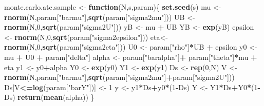\documentclass[]{book}
\newenvironment{Shaded}{\begin{snugshade}}{\end{snugshade}}
\newcommand{\ControlFlowTok}[1]{\textcolor[rgb]{0.13,0.29,0.53}{\textbf{#1}}}
\newcommand{\DecValTok}[1]{\textcolor[rgb]{0.00,0.00,0.81}{#1}}
\newcommand{\KeywordTok}[1]{\textcolor[rgb]{0.13,0.29,0.53}{\textbf{#1}}}
\newcommand{\NormalTok}[1]{#1}
\newcommand{\OperatorTok}[1]{\textcolor[rgb]{0.81,0.36,0.00}{\textbf{#1}}}
\newcommand{\StringTok}[1]{\textcolor[rgb]{0.31,0.60,0.02}{#1}}
\theoremstyle{definition}
\theoremstyle{definition}
\theoremstyle{definition}
\theoremstyle{remark}
\begin{document}
\begin{Shaded}
\begin{Highlighting}[]
\NormalTok{monte.carlo.ate.sample <-}\StringTok{ }\ControlFlowTok{function}\NormalTok{(N,s,param)\{}
  \KeywordTok{set.seed}\NormalTok{(s)}
\NormalTok{  mu <-}\StringTok{ }\KeywordTok{rnorm}\NormalTok{(N,param[}\StringTok{"barmu"}\NormalTok{],}\KeywordTok{sqrt}\NormalTok{(param[}\StringTok{"sigma2mu"}\NormalTok{]))}
\NormalTok{  UB <-}\StringTok{ }\KeywordTok{rnorm}\NormalTok{(N,}\DecValTok{0}\NormalTok{,}\KeywordTok{sqrt}\NormalTok{(param[}\StringTok{"sigma2U"}\NormalTok{]))}
\NormalTok{  yB <-}\StringTok{ }\NormalTok{mu }\OperatorTok{+}\StringTok{ }\NormalTok{UB }
\NormalTok{  YB <-}\StringTok{ }\KeywordTok{exp}\NormalTok{(yB)}
\NormalTok{  epsilon <-}\StringTok{ }\KeywordTok{rnorm}\NormalTok{(N,}\DecValTok{0}\NormalTok{,}\KeywordTok{sqrt}\NormalTok{(param[}\StringTok{"sigma2epsilon"}\NormalTok{]))}
\NormalTok{  eta<-}\StringTok{ }\KeywordTok{rnorm}\NormalTok{(N,}\DecValTok{0}\NormalTok{,}\KeywordTok{sqrt}\NormalTok{(param[}\StringTok{"sigma2eta"}\NormalTok{]))}
\NormalTok{  U0 <-}\StringTok{ }\NormalTok{param[}\StringTok{"rho"}\NormalTok{]}\OperatorTok{*}\NormalTok{UB }\OperatorTok{+}\StringTok{ }\NormalTok{epsilon}
\NormalTok{  y0 <-}\StringTok{ }\NormalTok{mu }\OperatorTok{+}\StringTok{  }\NormalTok{U0 }\OperatorTok{+}\StringTok{ }\NormalTok{param[}\StringTok{"delta"}\NormalTok{]}
\NormalTok{  alpha <-}\StringTok{ }\NormalTok{param[}\StringTok{"baralpha"}\NormalTok{]}\OperatorTok{+}\StringTok{  }\NormalTok{param[}\StringTok{"theta"}\NormalTok{]}\OperatorTok{*}\NormalTok{mu }\OperatorTok{+}\StringTok{ }\NormalTok{eta}
\NormalTok{  y1 <-}\StringTok{ }\NormalTok{y0}\OperatorTok{+}\NormalTok{alpha}
\NormalTok{  Y0 <-}\StringTok{ }\KeywordTok{exp}\NormalTok{(y0)}
\NormalTok{  Y1 <-}\StringTok{ }\KeywordTok{exp}\NormalTok{(y1)}
\NormalTok{  Ds <-}\StringTok{ }\KeywordTok{rep}\NormalTok{(}\DecValTok{0}\NormalTok{,N)}
\NormalTok{  V <-}\StringTok{ }\KeywordTok{rnorm}\NormalTok{(N,param[}\StringTok{"barmu"}\NormalTok{],}\KeywordTok{sqrt}\NormalTok{(param[}\StringTok{"sigma2mu"}\NormalTok{]}\OperatorTok{+}\NormalTok{param[}\StringTok{"sigma2U"}\NormalTok{]))}
\NormalTok{  Ds[V}\OperatorTok{<=}\KeywordTok{log}\NormalTok{(param[}\StringTok{"barY"}\NormalTok{])] <-}\StringTok{ }\DecValTok{1} 
\NormalTok{  y <-}\StringTok{ }\NormalTok{y1}\OperatorTok{*}\NormalTok{Ds}\OperatorTok{+}\NormalTok{y0}\OperatorTok{*}\NormalTok{(}\DecValTok{1}\OperatorTok{-}\NormalTok{Ds)}
\NormalTok{  Y <-}\StringTok{ }\NormalTok{Y1}\OperatorTok{*}\NormalTok{Ds}\OperatorTok{+}\NormalTok{Y0}\OperatorTok{*}\NormalTok{(}\DecValTok{1}\OperatorTok{-}\NormalTok{Ds)}
  \KeywordTok{return}\NormalTok{(}\KeywordTok{mean}\NormalTok{(alpha))}
\NormalTok{\}}


\end{Highlighting}
\end{Shaded}
\end{document}
